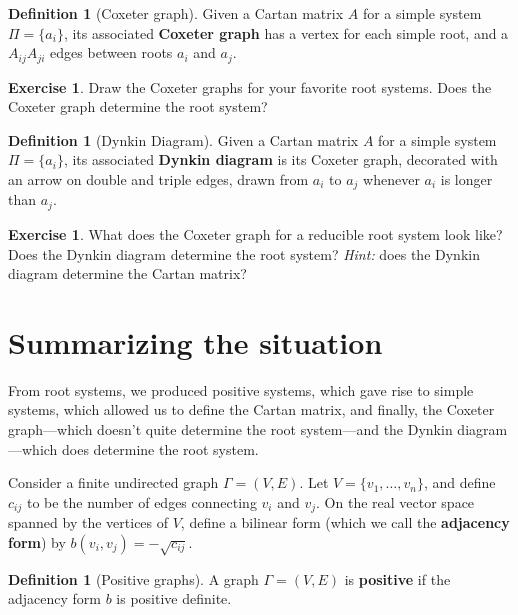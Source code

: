 \documentclass[12pt]{article}
\theoremstyle{remark}
\theoremstyle{definition}
\newtheorem{defn}[thm]{Definition}
\newtheorem{exercise}[thm]{Exercise}
\newcommand{\defnword}[1]{\textbf{#1}}
\begin{document}
\begin{defn}[Coxeter graph]
Given a Cartan matrix $A$ for a simple system $\Pi = \{ a_i \}$, its
associated \defnword{Coxeter graph} has a vertex for each simple root,
and a $A_{ij}A_{ji}$ edges between roots $a_i$ and $a_j$.
\end{defn}

\begin{exercise}
Draw the Coxeter graphs for your favorite root systems.  Does the
Coxeter graph determine the root system?
\end{exercise}

\begin{defn}[Dynkin Diagram]
Given a Cartan matrix $A$ for a simple system $\Pi = \{ a_i \}$, its
associated \defnword{Dynkin diagram} is its Coxeter graph, decorated
with an arrow on double and triple edges, drawn from $a_i$ to $a_j$
whenever $a_i$ is longer than $a_j$.
\end{defn}

\begin{exercise}
What does the Coxeter graph for a reducible root system look like?
Does the Dynkin diagram determine the root system?  \textit{Hint:}
does the Dynkin diagram determine the Cartan matrix?
\end{exercise}

\section{Summarizing the situation}

From root systems, we produced positive systems, which gave rise to
simple systems, which allowed us to define the Cartan matrix, and
finally, the Coxeter graph---which doesn't quite determine the root
system---and the Dynkin diagram---which does determine the root
system.

Consider a finite undirected graph $\Gamma = (V,E)$.  Let $V = \{ v_1,
\ldots, v_n \}$, and define $c_{ij}$ to be the number of edges
connecting $v_i$ and $v_j$.  On the real vector space spanned by the
vertices of $V$, define a bilinear form (which we call the
\defnword{adjacency form}) by $b(v_i,v_j) = -\sqrt{c_{ij}}$.

\begin{defn}[Positive graphs]
A graph $\Gamma = (V,E)$ is \defnword{positive} if the adjacency form $b$ is positive definite.
\end{defn}
\end{document}
